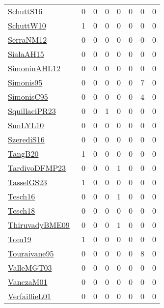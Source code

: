 {\begin{longtable}{l*{7}{r}}
\href{papers/SchuttS16.pdf}{SchuttS16}~\cite{SchuttS16} & 0 & 0 & 0 & 0 & 0 & 0 & 0\\
\href{papers/SchuttW10.pdf}{SchuttW10}~\cite{SchuttW10} & 1 & 0 & 0 & 0 & 0 & 0 & 0\\
\href{papers/SerraNM12.pdf}{SerraNM12}~\cite{SerraNM12} & 0 & 0 & 0 & 0 & 0 & 0 & 0\\
\href{papers/SialaAH15.pdf}{SialaAH15}~\cite{SialaAH15} & 0 & 0 & 0 & 0 & 0 & 0 & 0\\
\href{papers/SimoninAHL12.pdf}{SimoninAHL12}~\cite{SimoninAHL12} & 0 & 0 & 0 & 0 & 0 & 0 & 0\\
\href{papers/Simonis95.pdf}{Simonis95}~\cite{Simonis95} & 0 & 0 & 0 & 0 & 0 & 7 & 0\\
\href{papers/SimonisC95.pdf}{SimonisC95}~\cite{SimonisC95} & 0 & 0 & 0 & 0 & 0 & 4 & 0\\
\href{papers/SquillaciPR23.pdf}{SquillaciPR23}~\cite{SquillaciPR23} & 0 & 0 & 1 & 0 & 0 & 0 & 0\\
\href{papers/SunLYL10.pdf}{SunLYL10}~\cite{SunLYL10} & 0 & 0 & 0 & 0 & 0 & 0 & 0\\
\href{papers/SzerediS16.pdf}{SzerediS16}~\cite{SzerediS16} & 0 & 0 & 0 & 0 & 0 & 0 & 0\\
\href{papers/TangB20.pdf}{TangB20}~\cite{TangB20} & 1 & 0 & 0 & 0 & 0 & 0 & 0\\
\href{papers/TardivoDFMP23.pdf}{TardivoDFMP23}~\cite{TardivoDFMP23} & 0 & 0 & 0 & 1 & 0 & 0 & 0\\
\href{papers/TasselGS23.pdf}{TasselGS23}~\cite{TasselGS23} & 1 & 0 & 0 & 0 & 0 & 0 & 0\\
\href{papers/Tesch16.pdf}{Tesch16}~\cite{Tesch16} & 0 & 0 & 0 & 1 & 0 & 0 & 0\\
\href{papers/Tesch18.pdf}{Tesch18}~\cite{Tesch18} & 0 & 0 & 0 & 0 & 0 & 0 & 0\\
\href{papers/ThiruvadyBME09.pdf}{ThiruvadyBME09}~\cite{ThiruvadyBME09} & 0 & 0 & 0 & 1 & 0 & 0 & 0\\
\href{papers/Tom19.pdf}{Tom19}~\cite{Tom19} & 1 & 0 & 0 & 0 & 0 & 0 & 0\\
\href{papers/Touraivane95.pdf}{Touraivane95}~\cite{Touraivane95} & 0 & 0 & 0 & 0 & 0 & 8 & 0\\
\href{papers/ValleMGT03.pdf}{ValleMGT03}~\cite{ValleMGT03} & 0 & 0 & 0 & 0 & 0 & 0 & 0\\
\href{papers/VanczaM01.pdf}{VanczaM01}~\cite{VanczaM01} & 0 & 0 & 0 & 0 & 0 & 0 & 0\\
\href{papers/VerfaillieL01.pdf}{VerfaillieL01}~\cite{VerfaillieL01} & 0 & 0 & 0 & 0 & 0 & 0 & 0\\

\end{longtable}}
